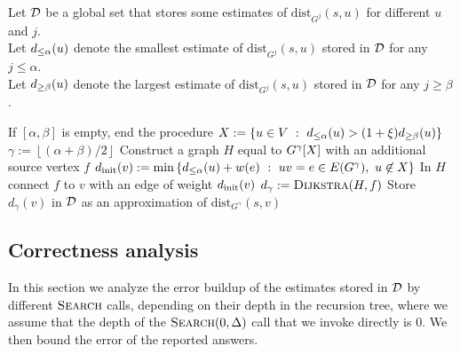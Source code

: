 \documentclass[11pt,letterpaper]{article}
\theoremstyle{plain}
\newcommand{\dist}{\mathrm{dist}}
\newcommand{\set}[1]{\left\lbrace #1 \right\rbrace}
\begin{document}
\begin{algorithm}[t]
\caption{($\alpha$, $\beta$)}\label{alg:offline}
Let $\mathcal{D}$ be a global set that stores some estimates of $\dist_{G^j}(s,u)$ for different $u$ and $j$. \\
Let $d_{\le\alpha}(u)$ denote the smallest estimate of $\dist_{G^j}(s,u)$ stored in $\mathcal{D}$ for any $j \le \alpha$. \\
Let $d_{\ge\beta}(u)$ denote the largest estimate of $\dist_{G^j}(s,u)$ stored in $\mathcal{D}$ for any $j \ge \beta$.
\begin{algorithmic}[1]
  \State If $[\alpha, \beta]$ is empty, end the procedure
  \State $\VV := \set{u\in V \ : \  \dla(u) > (1 + \epsp)\dgb(u)}$\label{line:VV}
  \State $\gamma := \left\lfloor\left(\alpha + \beta\right) / 2\right\rfloor$
  \State Construct a graph $H$ equal to $G^\gamma[X]$ with an additional source vertex $f$
        \State $\dinit(v) := \min\set{\dla(u) + w(e) \ : \ uv=e \in E(G^\gamma), \ u \not \in \VV}$ \label{line:d_init}
    \State In $H$ connect $f$ to $v$ with an edge of weight $d_\mathrm{init}(v)$
  \EndFor
  \State $\dg := \Call{Dijkstra}{H, f}$ \Comment{$\dg(v) = \dist_H(f, v)$ for all $v$} \label{line:Dijkstra}
    \State Store $d_\gamma(v)$ in $\mathcal{D}$ as an approximation of $\dist_{G^\gamma}(s,v)$
  \EndFor
  \State {}
  \State {}
\end{algorithmic}
\end{algorithm}

\subsection{Correctness analysis}
In this section we analyze the error buildup of the estimates stored in $\mathcal{D}$ by different $\textproc{Search}$ calls, depending on their depth in the recursion tree, where we assume that the depth of the $\textproc{Search}(0, \Delta)$ call that we invoke directly is $0$. 
We then bound the error of the reported answers.
\end{document}
